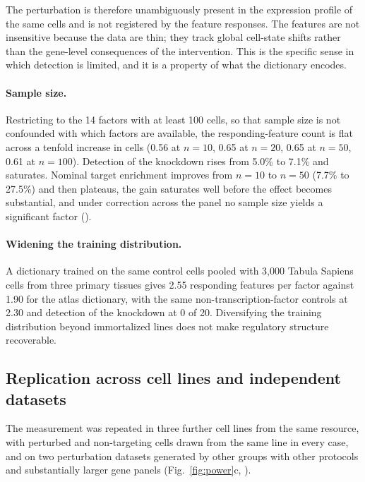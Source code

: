 \documentclass[onecolumn,11pt]{article}
\begin{document}
The perturbation is therefore unambiguously present in the expression profile of the same cells and
is not registered by the feature responses. The features are not insensitive because the data are
thin; they track global cell-state shifts rather than the gene-level consequences of the
intervention. This is the specific sense in which detection is limited, and it is a property of what
the dictionary encodes.

\paragraph{Sample size.} Restricting to the 14 factors with at least 100 cells, so that sample size
is not confounded with which factors are available, the responding-feature count is flat across a
tenfold increase in cells (0.56 at $n{=}10$, 0.65 at $n{=}20$, 0.65 at $n{=}50$, 0.61 at
$n{=}100$). Detection of the knockdown rises from 5.0\% to 7.1\% and saturates. Nominal target
enrichment improves from $n{=}10$ to $n{=}50$ (7.7\% to 27.5\%) and then plateaus, the gain
saturates well before the effect becomes substantial, and under correction across the panel no
sample size yields a significant factor
().

\paragraph{Widening the training distribution.} A dictionary trained on the same control cells
pooled with 3,000 Tabula Sapiens cells from three primary tissues gives 2.55 responding features per
factor against 1.90 for the atlas dictionary, with the same non-transcription-factor controls at
2.30 and detection of the knockdown at 0 of 20. Diversifying the training distribution beyond
immortalized lines does not make regulatory structure recoverable.

\subsection*{Replication across cell lines and independent datasets}
\label{sec:replication}

The measurement was repeated in three further cell lines from the same resource, with perturbed and
non-targeting cells drawn from the same line in every case, and on two perturbation datasets
generated by other groups with other protocols and substantially larger gene panels
(Fig.~\ref{fig:power}c, ).
\end{document}
